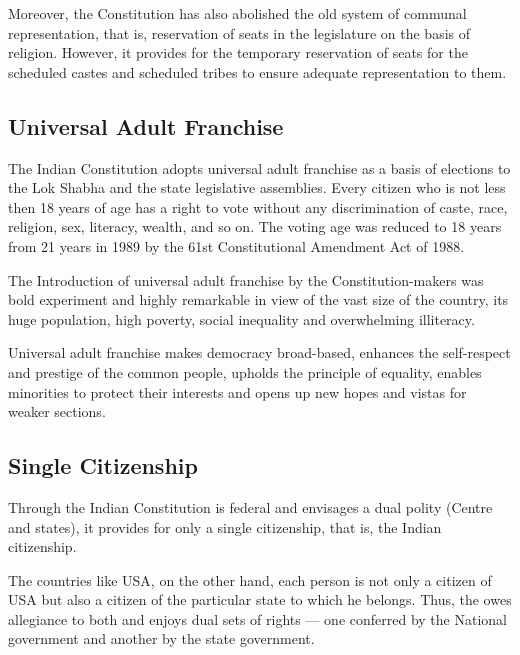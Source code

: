 \begin{multicols}{2}
Moreover, the Constitution has also abolished the old system of communal representation, that is, reservation of seats in the legislature on the basis of religion. However, it provides for the temporary reservation of seats for the scheduled castes and scheduled tribes to ensure adequate representation to them.

\subsection{Universal Adult Franchise}

The Indian Constitution adopts universal adult franchise as a basis of elections to the Lok Shabha and the state legislative assemblies. Every citizen who is not less then 18 years of age has a right to vote without any discrimination of caste, race, religion, sex, literacy, wealth, and so on. The voting age was reduced to 18 years from 21 years in 1989 by the 61st Constitutional Amendment Act of 1988.

The Introduction of universal adult franchise by the Constitution-makers was bold experiment and highly remarkable in view of the vast size of the country, its huge population, high poverty, social inequality and overwhelming illiteracy.

Universal adult franchise makes democracy broad-based, enhances the self-respect and prestige of the common people, upholds the principle of equality, enables minorities to protect their interests and opens up new hopes and vistas for weaker sections.

\subsection{Single Citizenship}

Through the Indian Constitution is federal and envisages a dual polity (Centre and states), it provides for only a single citizenship, that is, the Indian citizenship.

The countries like USA, on the other hand, each person is not only a citizen of USA but also a citizen of the particular state to which he belongs. Thus, the owes allegiance to both and enjoys dual sets of rights — one conferred by the National government and another by the state government.


\end{multicols}
